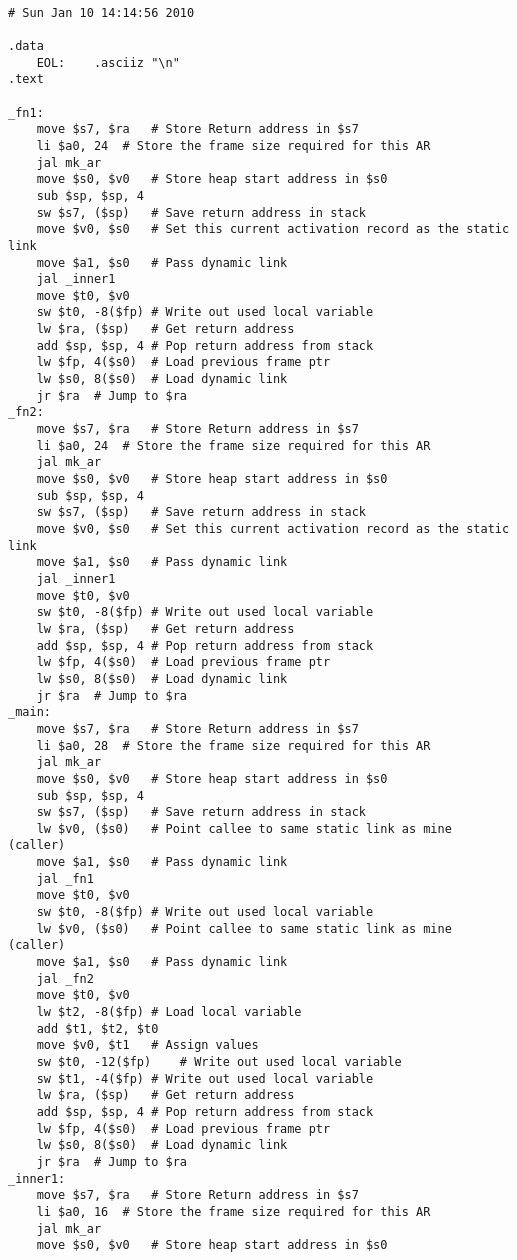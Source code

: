 \begin{lstlisting}[showstringspaces=false,breaklines=true,backgroundcolor=\color{light-gray}, captionpos=b]
         
# Sun Jan 10 14:14:56 2010

.data
	EOL:	.asciiz "\n"
.text

_fn1:
	move $s7, $ra	# Store Return address in $s7
	li $a0, 24	# Store the frame size required for this AR
	jal mk_ar
	move $s0, $v0	# Store heap start address in $s0
	sub $sp, $sp, 4
	sw $s7, ($sp)	# Save return address in stack
	move $v0, $s0	# Set this current activation record as the static link
	move $a1, $s0	# Pass dynamic link
	jal _inner1
	move $t0, $v0
	sw $t0, -8($fp)	# Write out used local variable
	lw $ra, ($sp)	# Get return address
	add $sp, $sp, 4	# Pop return address from stack
	lw $fp, 4($s0)	# Load previous frame ptr
	lw $s0, 8($s0)	# Load dynamic link
	jr $ra	# Jump to $ra
_fn2:
	move $s7, $ra	# Store Return address in $s7
	li $a0, 24	# Store the frame size required for this AR
	jal mk_ar
	move $s0, $v0	# Store heap start address in $s0
	sub $sp, $sp, 4
	sw $s7, ($sp)	# Save return address in stack
	move $v0, $s0	# Set this current activation record as the static link
	move $a1, $s0	# Pass dynamic link
	jal _inner1
	move $t0, $v0
	sw $t0, -8($fp)	# Write out used local variable
	lw $ra, ($sp)	# Get return address
	add $sp, $sp, 4	# Pop return address from stack
	lw $fp, 4($s0)	# Load previous frame ptr
	lw $s0, 8($s0)	# Load dynamic link
	jr $ra	# Jump to $ra
_main:
	move $s7, $ra	# Store Return address in $s7
	li $a0, 28	# Store the frame size required for this AR
	jal mk_ar
	move $s0, $v0	# Store heap start address in $s0
	sub $sp, $sp, 4
	sw $s7, ($sp)	# Save return address in stack
	lw $v0, ($s0)	# Point callee to same static link as mine (caller)
	move $a1, $s0	# Pass dynamic link
	jal _fn1
	move $t0, $v0
	sw $t0, -8($fp)	# Write out used local variable
	lw $v0, ($s0)	# Point callee to same static link as mine (caller)
	move $a1, $s0	# Pass dynamic link
	jal _fn2
	move $t0, $v0
	lw $t2, -8($fp)	# Load local variable
	add $t1, $t2, $t0
	move $v0, $t1	# Assign values
	sw $t0, -12($fp)	# Write out used local variable
	sw $t1, -4($fp)	# Write out used local variable
	lw $ra, ($sp)	# Get return address
	add $sp, $sp, 4	# Pop return address from stack
	lw $fp, 4($s0)	# Load previous frame ptr
	lw $s0, 8($s0)	# Load dynamic link
	jr $ra	# Jump to $ra
_inner1:
	move $s7, $ra	# Store Return address in $s7
	li $a0, 16	# Store the frame size required for this AR
	jal mk_ar
	move $s0, $v0	# Store heap start address in $s0

\end{lstlisting}
